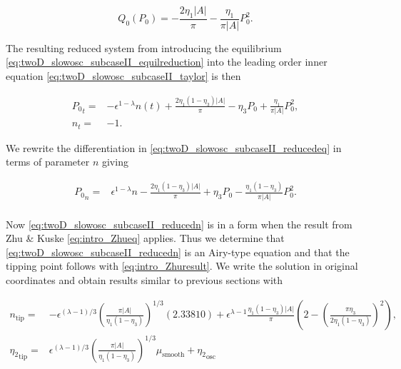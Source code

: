 \begin{equation}\label{eq:twoD_slowosc_subcaseII_equilreduction}
{Q_0}(P_0) =  -\frac{2\eta_1|A|}{\pi}-\frac{\eta_1}{\pi|A|}P_0^2.
\end{equation}

The resulting reduced system from introducing the equilibrium \eqref{eq:twoD_slowosc_subcaseII_equilreduction} into the leading order inner equation \eqref{eq:twoD_slowosc_subcaseII_taylor} is then

\begin{equation}\label{eq:twoD_slowosc_subcaseII_reducedeq}
\begin{aligned}
{P_0}_t =& -\epsilon^{1-\lambda}n(t)+\frac{2\eta_1(1-\eta_3)|A|}{\pi}-\eta_3P_0+\frac{\eta_1}{\pi|A|}P_0^2,\\
n_t=&-1.
\end{aligned}
\end{equation}

We rewrite the differentiation in \eqref{eq:twoD_slowosc_subcaseII_reducedeq} in terms of parameter $n$ giving 

\begin{equation} \label{eq:twoD_slowosc_subcaseII_reducedn}
\begin{aligned}
{P_0}_n =& \epsilon^{1-\lambda} n -\frac{2\eta_1(1-\eta_3)|A|}{\pi}+\eta_3 P_0-\frac{\eta_1(1-\eta_3)}{\pi|A|}P_0^2.\\
\end{aligned}
\end{equation}

Now \eqref{eq:twoD_slowosc_subcaseII_reducedn} is in a form when the result from Zhu \& Kuske \eqref{eq:intro_Zhueq} applies. Thus we determine that \eqref{eq:twoD_slowosc_subcaseII_reducedn} is an Airy-type equation and that the tipping point follows with \eqref{eq:intro_Zhuresult}. We write the solution in original coordinates and obtain results similar to previous sections with

\begin{equation}\label{eq:twoD_slowosc_subcaseII_tipping}
\begin{aligned}
n_{\text{tip}} =& -\epsilon^{(\lambda-1)/3}\left(\frac{\pi|A|}{\eta_1(1-\eta_3)}\right)^{1/3}(2.33810)+\epsilon^{\lambda-1}\frac{\eta_1(1-\eta_3)|A|}{\pi}\left(2-\left(\frac{\pi\eta_3}{2\eta_1(1-\eta_3)}\right)^2\right),\\
{\eta_2}_{\text{tip}} =& \epsilon^{(\lambda-1)/3}\left(\frac{\pi|A|}{\eta_1(1-\eta_3)}\right)^{1/3}\mu_{\text{smooth}}+{\eta_2}_{\text{osc}}
\end{aligned}
\end{equation}

